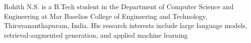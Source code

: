 \documentclass{ieeeaccess}
\begin{document}
\begin{IEEEbiographynophoto}{Rohith N.S.}
is a B.Tech student in the Department of Computer Science and Engineering at Mar Baselios College of Engineering and Technology, Thiruvananthapuram, India. His research interests include large language models, retrieval-augmented generation, and applied machine learning
\end{IEEEbiographynophoto}

\EOD
\end{document}
